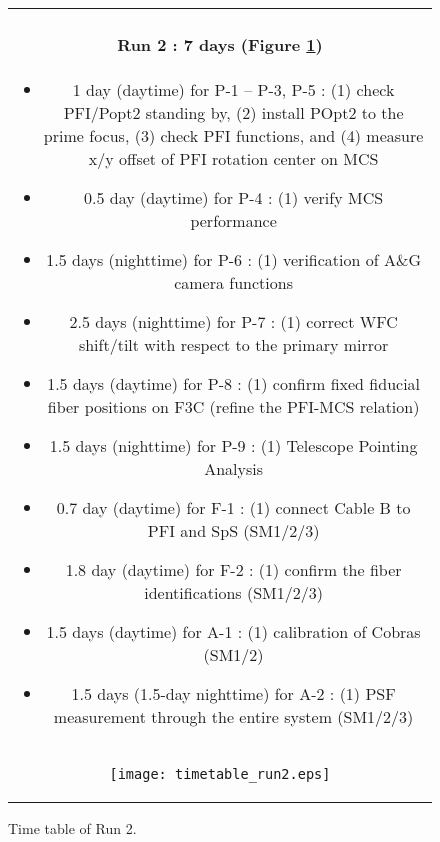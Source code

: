 \begin{figure}[!ht]
\begin{center}
\begin{tabular}{c}
\begin{minipage}{0.95\hsize}
\paragraph{Run 2 : 7 days  (Figure \ref{fig:run2})}
	\begin{itemize}
	\item 1 day (daytime) for P-1 -- P-3, P-5 :
	(1) check PFI/Popt2 standing by,
	(2) install POpt2 to the prime focus,
	(3) check PFI functions, and
	(4) measure x/y offset of PFI rotation center on MCS
	\item 0.5 day (daytime) for P-4 :
	(1) verify  MCS performance
	\item 1.5 days (nighttime) for P-6 :
	(1) verification of A\&G camera functions 
	\item 2.5 days (nighttime) for P-7 :
	(1) correct WFC shift/tilt with respect to the primary mirror
	\item 1.5 days (daytime) for P-8 :  
	(1) confirm fixed fiducial fiber positions on F3C (refine the PFI-MCS relation)
	\item 1.5 days (nighttime) for P-9 :
	(1) Telescope Pointing Analysis
	\item 0.7 day (daytime) for F-1 : 
	(1) connect Cable B to PFI and SpS (SM1/2/3)
	\item 1.8 day (daytime) for F-2 :  
	(1) confirm  the fiber identifications (SM1/2/3)
	\item 1.5 days (daytime) for A-1 : 
	(1) calibration of Cobras (SM1/2)
	\item 1.5 days (1.5-day nighttime) for A-2 : 
	(1) PSF measurement through the entire system (SM1/2/3)	
\end{itemize}
\end{minipage} \\
\begin{minipage}{0.8\hsize}
	\begin{center}
	\vspace*{5mm}
	\texttt{[image: timetable\_run2.eps]}
	\end{center}
	\vspace*{-5mm}
	\caption{Time table of Run 2.}
	\label{fig:run2}
\end{minipage}
\end{tabular}
\end{center}
\end{figure}

